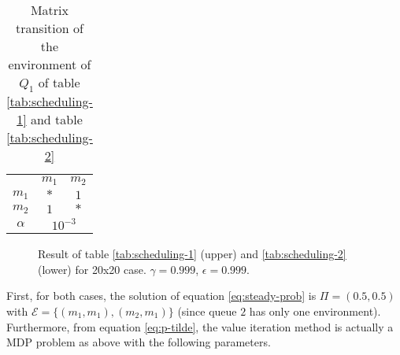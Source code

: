 \documentclass[
  a4paper, xcolor = usenames,dvipsnames]{article}
\theoremstyle{definition}
\theoremstyle{definition}
\theoremstyle{definition}
\theoremstyle{definition}
\theoremstyle{remark}
\begin{document}
\begin{table}[!htbp]
\caption{Matrix transition of the environment of $Q_{1}$ of table \ref{tab:scheduling-1} and table \ref{tab:scheduling-2}}
\begin{center}
\begin{tabular}{c c c}
    \hline
    & $m_{1}$ & $m_{2}$ \\
    $m_{1}$ & $*$ & $1$ \\
    $m_{2}$ & $1$ & $*$ \\
    \hline
    $\alpha$ & \multicolumn{2}{c}{$10^{-3}$} \\
    \hline
\end{tabular}
\end{center}
\label{tab:scheduling-1-mat-1}
\end{table}



\begin{figure}

{\centering {}\newline{}

}

\caption{Result of table \ref{tab:scheduling-1} (upper) and \ref{tab:scheduling-2} (lower) for 20x20 case. \(\gamma = 0.999\), \(\epsilon = 0.999\).}\label{fig:20x20-scheduling-1-2}
\end{figure}

First, for both cases, the solution of equation \eqref{eq:steady-prob} is \(\Pi = (0.5, 0.5)\) with \(\mathcal{E} = \{(m_{1}, m_{1}), (m_{2}, m_{1})\}\) (since queue \(2\) has only one environment). Furthermore, from equation \eqref{eq:p-tilde}, the value iteration method is actually a MDP problem as above with the following parameters.
\end{document}
